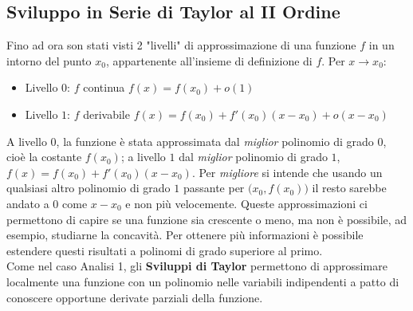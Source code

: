\subsection{Sviluppo in Serie di Taylor al II Ordine}
Fino ad ora son stati visti 2 "livelli" di approssimazione di una funzione $f$ in un intorno del punto $x_0$, appartenente all'insieme di definizione di $f$. Per $x \to x_0$:
\begin{itemize}
	\item Livello $0$: \quad $f$ continua \qquad $f(x) = f(x_0) + o(1)$
	\item Livello $1$: \quad $f$ derivabile \qquad $f(x) = f(x_0) + f'(x_0)(x - x_0) + o(x - x_0)$
\end{itemize}
A livello $0$, la funzione è stata approssimata dal \textit{miglior} polinomio di grado $0$, cioè la costante $f(x_0)$; a livello $1$ dal \textit{miglior} polinomio di grado $1$, $f(x) = f(x_0) + f'(x_0)(x - x_0)$. Per \textit{migliore} si intende che usando un qualsiasi altro polinomio di grado $1$ passante per $\bigl( x_0, f(x_0) \bigr)$ il resto sarebbe andato a $0$ come $x - x_0$ e non più velocemente. Queste approssimazioni ci permettono di capire se una funzione sia crescente o meno, ma non è possibile, ad esempio, studiarne la concavità. Per ottenere più informazioni è possibile estendere questi risultati a polinomi di grado superiore al primo.\\
Come nel caso Analisi 1, gli \textbf{Sviluppi di Taylor} permettono di approssimare localmente una funzione con un polinomio nelle variabili indipendenti a patto di conoscere opportune derivate parziali della funzione.

